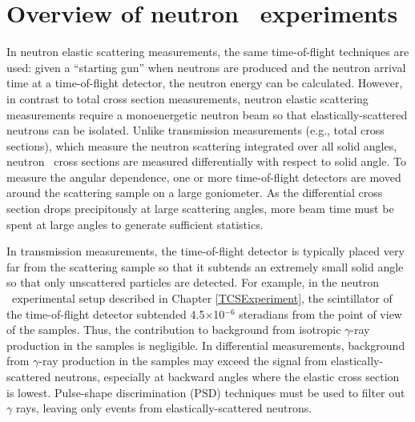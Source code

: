 \section{Overview of neutron \el\ experiments}
In neutron elastic scattering measurements, the same time-of-flight techniques are used:
given a ``starting gun'' when neutrons are produced and the neutron arrival time
at a time-of-flight detector, the neutron energy can be calculated.
However, in contrast to total cross section measurements, neutron elastic scattering
measurements require a monoenergetic neutron beam so that elastically-scattered
neutrons can be isolated. Unlike transmission measurements (e.g., total cross
sections), which measure the neutron scattering integrated
over all solid angles, neutron \el\ cross sections are measured differentially with respect to 
solid angle. To measure the angular dependence, one or more time-of-flight detectors
are moved around the scattering sample on a large goniometer. As the differential cross section 
drops precipitously at large scattering angles, more beam time must be spent at
large angles to generate sufficient statistics.

In transmission measurements, the time-of-flight detector is typically placed
very far from the scattering sample so that it subtends an extremely small solid
angle so that only unscattered particles are detected.
For example, in the neutron \tot\ experimental setup described in Chapter
\ref{TCSExperiment}, the scintillator of the time-of-flight detector subtended
4.5$\times$10$^{-6}$ steradians from the point of view of the samples. Thus, the
contribution to background from isotropic $\gamma$-ray production in the samples is negligible.
In differential measurements,
background from $\gamma$-ray production in the samples may exceed the signal
from elastically-scattered neutrons, especially at backward angles where the elastic
cross section is lowest. Pulse-shape discrimination (\gls{PSD})
techniques must be used to filter out 
$\gamma$ rays, leaving only events from elastically-scattered neutrons.

